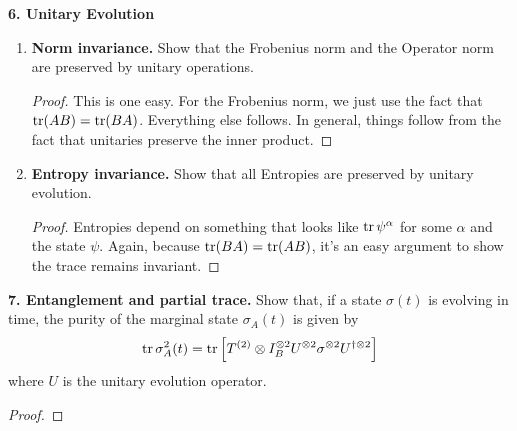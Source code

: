 \documentclass{book}
\theoremstyle{definition}
\newcommand{\al}{\alpha}
\newcommand{\lb}{\left[}
\newcommand{\rb}{\right]}
\begin{document}
\begin{enumerate}
\end{enumerate}






\noindent \textbf{6. Unitary Evolution}
\begin{enumerate}
	\item \textbf{Norm invariance.} Show that the Frobenius norm and the Operator norm are preserved by unitary operations.
	\begin{proof}
		This is one easy. For the Frobenius norm, we just use the fact that $\tr(AB) = \tr(BA)$. Everything else follows. In general, things follow from the fact that unitaries preserve the inner product.  
	\end{proof}
	
	\item \textbf{Entropy invariance.} Show that all Entropies are preserved by unitary evolution.
	\begin{proof}
		Entropies depend on something that looks like $\tr \psi^\al$ for some $\al$ and the state $\psi$. Again, because $\tr(BA) = \tr(AB)$, it's an easy argument to show the trace remains invariant.
	\end{proof}

\end{enumerate}



\noindent \textbf{7. Entanglement and partial trace.} Show that, if a state $\sigma(t)$ is evolving in time, the purity of the marginal state $\sigma_A(t)$ is given by 
\begin{align}
\tr \sigma^2_A(t) = \tr \lb T^{(2)} \otimes I_B^{\otimes 2} U^{\otimes 2} \sigma^{\otimes 2} U^{\dagger \otimes 2} \rb
\end{align}
where $U$ is the unitary evolution operator.
\begin{proof}
	
\end{proof}
\end{document}
